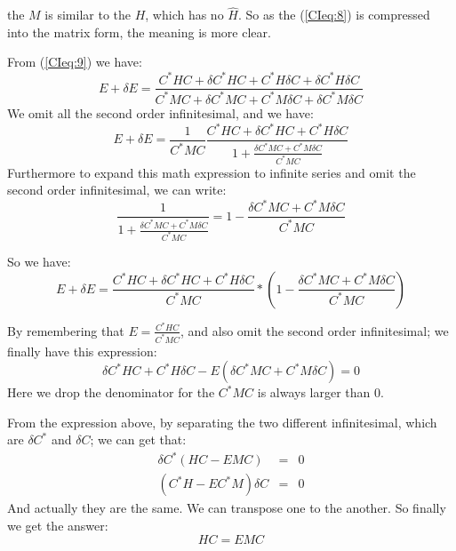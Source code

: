 the $M$ is similar to the $H$, which has no $\hat{H}$. So as the
(\ref{CIeq:8}) is compressed into the matrix form, the meaning is more
clear.

From (\ref{CIeq:9}) we have:
\begin{equation}\label{CIeq:11}
  E + \delta E = \frac{C^{*}HC + \delta C^{*}HC + C^{*}H \delta C + \delta C^{*}H \delta C }
  {C^{*}MC + \delta C^{*}MC + C^{*}M \delta C + \delta C^{*}M \delta C}
\end{equation}
We omit all the second order infinitesimal, and we have:
\begin{equation}\label{CIeq:12}
  E + \delta E = \frac{1}{C^{*}MC} \frac{C^{*}HC + \delta C^{*}HC + C^{*}H \delta C }
  { 1+ \frac{\delta C^{*}MC + C^{*}M \delta C}{C^{*}MC}}
\end{equation}
Furthermore to expand this math expression to infinite series and omit
the second order infinitesimal, we can write:
\begin{equation}\label{CIeq:13}
  \frac{1}{ 1+ \frac{\delta C^{*}MC + C^{*}M \delta C}{C^{*}MC} } = 1
  - \frac{\delta C^{*}MC + C^{*}M \delta C}{C^{*}MC}
\end{equation}


So we have:
\begin{equation}\label{CIeq:14}
  E + \delta E = \frac{C^{*}HC + \delta C^{*}HC + C^{*}H \delta
    C}{C^{*}MC} * (1 - \frac{\delta C^{*}MC + C^{*}M \delta C}{C^{*}MC})
\end{equation}

By remembering that $E=\frac{C^{*}HC}{C^{*}MC}$, and also omit the
second order infinitesimal; we finally have this expression:
\begin{equation}\label{CIeq:15}
  \delta C^{*}HC + C^{*}H \delta C - E(\delta C^{*}MC + C^{*}M \delta
  C) = 0
\end{equation}
Here we drop the denominator for the $C^{*}MC$ is always larger than
0.

From the expression above, by separating the two different
infinitesimal, which are $\delta C^{*}$ and $\delta C$; we can get
that:
\begin{eqnarray}\label{CIeq:16}
  \delta C^{*}(HC-EMC)  &=& 0 \nonumber \\
  (C^{*}H-EC^{*}M)\delta C&=& 0
\end{eqnarray}
And actually they are the same. We can transpose one to the another.
So finally we get the answer:
\begin{equation}\label{CIeq:17}
  HC=EMC
\end{equation}


